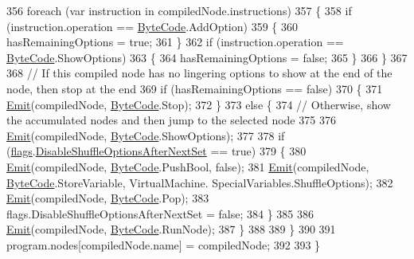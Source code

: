 \begin{DoxyCode}
356                 \textcolor{keywordflow}{foreach} (var instruction \textcolor{keywordflow}{in} compiledNode.instructions)
357                 \{
358                     \textcolor{keywordflow}{if} (instruction.operation == \hyperlink{a00029_ad5dfb6ee68ca7469623ad3e459f98894}{ByteCode}.AddOption)
359                     \{
360                         hasRemainingOptions = \textcolor{keyword}{true};
361                     \}
362                     \textcolor{keywordflow}{if} (instruction.operation == \hyperlink{a00029_ad5dfb6ee68ca7469623ad3e459f98894}{ByteCode}.ShowOptions)
363                     \{
364                         hasRemainingOptions = \textcolor{keyword}{false};
365                     \}
366                 \}
367 
368                 \textcolor{comment}{// If this compiled node has no lingering options to show at the end of the node, then stop
       at the end}
369                 \textcolor{keywordflow}{if} (hasRemainingOptions == \textcolor{keyword}{false})
370                 \{
371                     \hyperlink{a00032_a774e8c143cdda0584fcfdda98626a83c}{Emit}(compiledNode, \hyperlink{a00029_ad5dfb6ee68ca7469623ad3e459f98894}{ByteCode}.Stop);
372                 \}
373                 \textcolor{keywordflow}{else} \{
374                     \textcolor{comment}{// Otherwise, show the accumulated nodes and then jump to the selected node}
375 
376                     \hyperlink{a00032_a774e8c143cdda0584fcfdda98626a83c}{Emit}(compiledNode, \hyperlink{a00029_ad5dfb6ee68ca7469623ad3e459f98894}{ByteCode}.ShowOptions);
377 
378                     \textcolor{keywordflow}{if} (\hyperlink{a00032_a541022d89bcf9bc8f794eb6d6b438d08}{flags}.\hyperlink{a00032_a8b49bb7763ff477cba21d7c771ef3ed0}{DisableShuffleOptionsAfterNextSet} == \textcolor{keyword}{
      true})
379                     \{
380                         \hyperlink{a00032_a774e8c143cdda0584fcfdda98626a83c}{Emit}(compiledNode, \hyperlink{a00029_ad5dfb6ee68ca7469623ad3e459f98894}{ByteCode}.PushBool, \textcolor{keyword}{false});
381                         \hyperlink{a00032_a774e8c143cdda0584fcfdda98626a83c}{Emit}(compiledNode, \hyperlink{a00029_ad5dfb6ee68ca7469623ad3e459f98894}{ByteCode}.StoreVariable, VirtualMachine.
      SpecialVariables.ShuffleOptions);
382                         \hyperlink{a00032_a774e8c143cdda0584fcfdda98626a83c}{Emit}(compiledNode, \hyperlink{a00029_ad5dfb6ee68ca7469623ad3e459f98894}{ByteCode}.Pop);
383                         flags.DisableShuffleOptionsAfterNextSet = \textcolor{keyword}{false};
384                     \}
385 
386                     \hyperlink{a00032_a774e8c143cdda0584fcfdda98626a83c}{Emit}(compiledNode, \hyperlink{a00029_ad5dfb6ee68ca7469623ad3e459f98894}{ByteCode}.RunNode);
387                 \}
388 
389             \}
390 
391             program.nodes[compiledNode.name] = compiledNode;
392 
393         \}
\end{DoxyCode}
